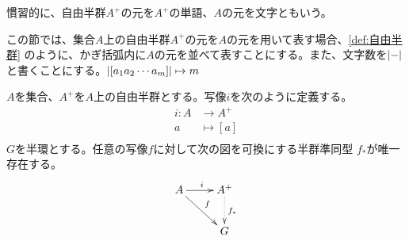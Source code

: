 	慣習的に、自由半群$A^+$の元を$A^+$の単語、$A$の元を文字ともいう。

	この節では、集合$A$上の自由半群$A^+$の元を$A$の元を用いて表す場合、\ref{def:自由半群}
	のように、かぎ括弧内に$A$の元を並べて表すことにする。また、文字数を$\left|{-}\right|$
	と書くことにする。$\left|{\left[{a_1a_2\cdots a_m}\right]}\right|\mapsto m$

	\begin{proposition}[自由半群の普遍性]\label{pro:自由半群の普遍性} %
		$A$を集合、$A^+$を$A$上の自由半群とする。写像$i$を次のように定義する。
		\begin{equation}\begin{split} %
			i: A &\to A^+ \\
				a &\mapsto [a] \\
		\end{split}\end{equation} %
		$G$を半環とする。任意の写像$f$に対して次の図を可換にする半群準同型
		$f_*$が唯一存在する。
		\begin{equation}\xymatrix{
			A \ar[r]^i \ar[rd]^{f} & A^+ \ar@{.>}[d]^{f_*} \\
			& G \\
		}\end{equation}
	\end{proposition} %
